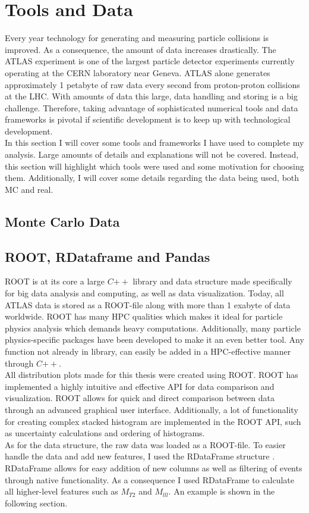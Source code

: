 \section{Tools and Data}
Every year technology for generating and measuring particle collisions is improved. 
As a consequence, the amount of data increases drastically. The ATLAS experiment
is one of the largest particle detector experiments currently operating at the 
CERN laboratory near Geneva. ATLAS alone generates approximately 1 petabyte of raw
data every second from proton-proton collisions at the \ac{LHC}. 
With amounts of data this large, data handling and storing is a big challenge. 
Therefore, taking advantage of sophisticated numerical tools and data frameworks is
pivotal if scientific development is to keep up with technological development.
\\
In this section I will cover some tools and frameworks I have used to 
complete my analysis. Large amounts of details and explanations will not be covered. 
Instead, this section will highlight which tools were used and some motivation
for choosing them. Additionally, I will cover some details regarding the data
being used, both \ac{MC} and real.
\subsection{Monte Carlo Data}
\subsection{ROOT, RDataframe and Pandas}
ROOT \cite{ROOT} is at its core a large $C{++}$ library and data structure made specifically for big data
analysis and computing, as well as data visualization. Today, all ATLAS data is stored as a ROOT-file along
with more than 1 exabyte of data worldwide. ROOT has many \ac{HPC} qualities which makes it ideal for particle
physics analysis which demands heavy computations. Additionally, many particle physics-specific packages
have been developed to make it an even better tool. Any function not already in library,
can easily be added in a \ac{HPC}-effective manner through $C{++}$.
\\
All distribution plots made for this thesis were created using ROOT. ROOT has implemented a highly intuitive and
effective \ac{API} for data comparison and visualization. ROOT allows for quick and direct 
comparison between data through an advanced graphical user interface. Additionally, a lot of
functionality for creating complex stacked histogram are implemented in the ROOT \ac{API}, such
as uncertainty calculations and ordering of histograms. 
\\
As for the data structure, the raw data was loaded as a ROOT-file. To easier handle the data and add
new features, I used the RDataFrame structure \cite{RDataFrame}. RDataFrame allows for easy 
addition of new columns as well as filtering of events through native functionality. As a consequence
I used RDataFrame to calculate all higher-level features such as $M_{T2}$ and $M_{lll}$. An example is 
shown in the following section. 

